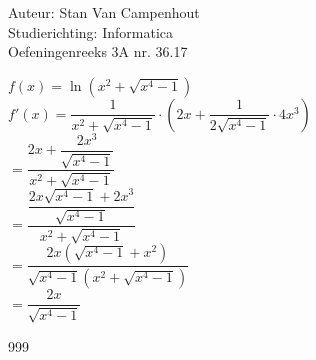 \documentclass[a4paper]{article}
\begin{document}
  
\noindent \large Auteur: Stan Van Campenhout \\
\noindent \large Studierichting:  Informatica\\
\noindent \large Oefeningenreeks 3A nr. 36.17\\

\medskip

\normalsize

$ f(x) = \ln\left(x^2 + \sqrt{x^4 - 1}\right) $\\

$ f'(x) = \dfrac{1}{x^2 + \sqrt{x^4 - 1}} \cdot \left(2x + \dfrac{1}{2 \sqrt{x^4 - 1}} \cdot 4x^3 \right) $\\

$ =  \dfrac{2x + \dfrac{2x^3}{\sqrt{x^4 - 1}}}{x^2 + \sqrt{x^4 - 1}} $\\

$ = \dfrac{\dfrac{2x\sqrt{x^4 - 1} + 2x^3}{\sqrt{x^4 - 1}}}{x^2 + \sqrt{x^4 - 1}} $\\

$ = \dfrac{2x\left(\sqrt{x^4 - 1} + x^2\right)}{\sqrt{x^4 - 1}\left(x^2 + \sqrt{x^4 - 1}\right)} $\\

$ = \dfrac{2x}{\sqrt{x^4 - 1}} $\\

\begin{thebibliography}{999}
\end{thebibliography}
\end{document}
